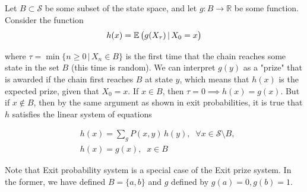 	\begin{example}
		Let $B \subset \mathcal{S}$ be some subset of the state space, and let $g: B \to \mathbb{R}$ be some function. Consider the function 
		\begin{equation}
			h(x) = \operatorname{\mathbb{E}}\big( g(X_\tau) \, |\, X_0 = x \big)
		\end{equation}

		where $\tau = \min\{ n\geq 0 \,|\, X_n \in B\}$ is the first time that the chain reaches some state in the set $B$ (this time is random). We can interpret $g(y)$ as a "prize" that is awarded if the chain first reaches $B$ at state $y$, which means that $h(x)$ is the expected prize, given that $X_0 = x$. If $x \in B$, then $\tau = 0 \implies h(x) = g(x)$. But if $x \not\in B$, then by the same argument as shown in exit probabilities, it is true that $h$ satisfies the linear system of equations

		\begin{align*}
			& h(x) = \sum_g P(x, y)\,h(y), \;\; \forall x \in \mathcal{S} \setminus B, \\
			& h(x) = g(x), \;\; x \in B 
		\end{align*}

		Note that Exit probability system is a special case of the Exit prize system. In the former, we have defined $B = \{a, b\}$ and $g$ defined by $g(a) = 0, g(b) = 1$. 
	\end{example}

